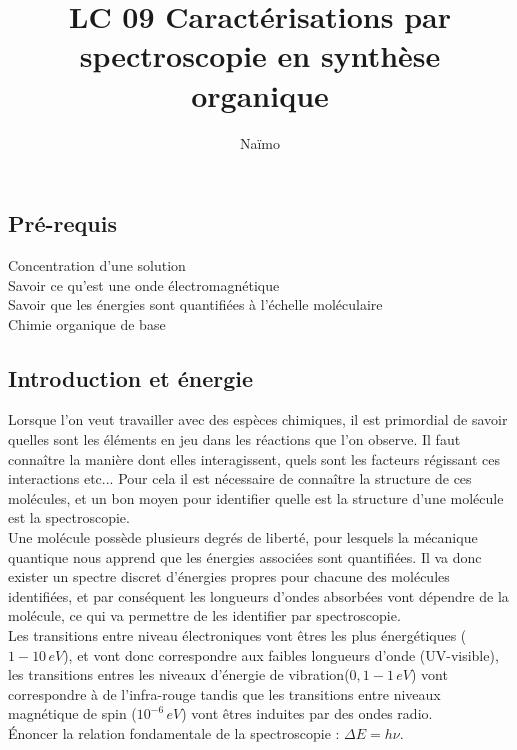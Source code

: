 \documentclass[12pt,prb,aps,epsf]{report}
\begin{document}
	
	\title{LC 09 Caractérisations par spectroscopie en synthèse organique}
	\author{Naïmo}
	
	\maketitle
	
	\tableofcontents
	
	\pagebreak

\subsection*{Pré-requis}
Concentration d'une solution\\
Savoir ce qu'est une onde électromagnétique\\
Savoir que les énergies sont quantifiées à l'échelle moléculaire\\
Chimie organique de base

\subsection{Introduction et énergie}
Lorsque l'on veut travailler avec des espèces chimiques, il est primordial de savoir quelles sont les éléments en jeu dans les réactions que l'on observe. Il faut connaître la manière dont elles interagissent, quels sont  les facteurs régissant ces interactions etc... Pour cela il est nécessaire de connaître la structure de ces molécules, et un bon moyen pour identifier quelle est la structure d'une molécule est la spectroscopie.\\

Une molécule possède plusieurs degrés de liberté, pour lesquels la mécanique quantique nous apprend que les énergies associées sont quantifiées. Il va donc exister un spectre discret d'énergies propres pour chacune des molécules identifiées, et par conséquent les longueurs d'ondes absorbées vont dépendre de la molécule, ce qui va permettre de les identifier par spectroscopie.\\ 
Les transitions entre niveau électroniques vont êtres les plus énergétiques ($1-10\,eV$), et vont donc correspondre aux faibles longueurs d'onde (UV-visible), les transitions entres les niveaux d'énergie de vibration($0,1-1\,eV$) vont correspondre à de l'infra-rouge tandis que les transitions entre niveaux magnétique de spin ($10^{-6}\,eV$) vont êtres induites par des ondes radio.\\

Énoncer la relation fondamentale de la spectroscopie : $\Delta E = h \nu$.
\end{document}
